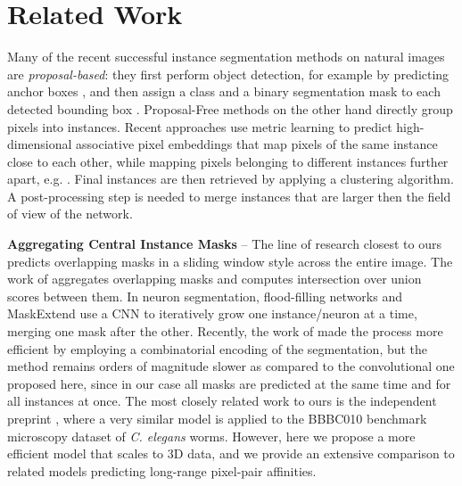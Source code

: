 
\section{Related Work} \label{sec:related_work}
Many of the recent successful instance segmentation methods on natural images are \emph{proposal-based}: they first perform object detection, for example by predicting anchor boxes \cite{ren2015faster}, and then assign a class and a binary segmentation mask to each detected bounding box \cite{he2017mask,porzi2019seamless}.
Proposal-Free methods on the other hand directly group pixels into instances. 
Recent approaches use metric learning to predict high-dimensional associative pixel embeddings that map pixels of the same instance close to each other, while mapping pixels belonging to different instances further apart, e.g. \cite{lee2019learning,kong2018recurrentPix}. %
Final instances are then retrieved by applying a clustering algorithm. A post-processing step is needed to merge instances that are larger then the field of view of the network. 

\textbf{Aggregating Central Instance Masks} -- 
The line of research closest to ours predicts overlapping \maskname masks in a sliding window style across the entire image. The work of \cite{liu2016multi} aggregates overlapping masks and computes intersection over union scores between them.
In neuron segmentation, flood-filling networks \cite{januszewski2018high} and MaskExtend \cite{meirovitch2016multi} use a CNN to iteratively grow one instance/neuron at a time, merging one mask after the other. Recently, the work of \cite{meirovitch2019cross} made the process more efficient by employing a combinatorial encoding of the segmentation, but the method remains orders of magnitude slower as compared to the convolutional one proposed here, since in our case all masks are predicted at the same time and for all instances at once.
The most closely related work to ours is the independent preprint \cite{hirsch2020patchperpix}, where a very similar model is applied to the BBBC010 benchmark microscopy dataset of \emph{C. elegans} worms. However, here we propose a more efficient model that scales to 3D data, and we provide an extensive comparison to related models predicting long-range pixel-pair affinities. 

